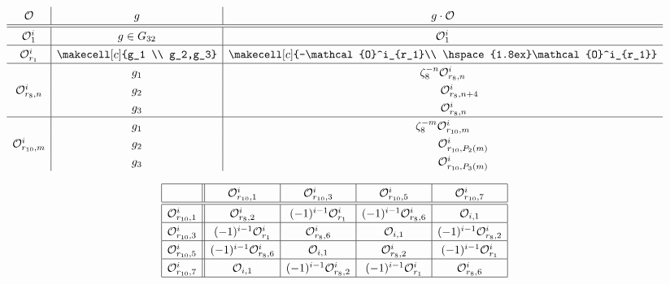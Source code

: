 \documentclass[aps,twocolumn,prx,floatfix,preprintnumbers, nofootinbib,10pt]{revtex4-2}
\numberwithin{equation}{section}
\theoremstyle{definition}
\newcommand{\cO}{\mathcal{O}}
\renewcommand{\Vec}{\mathsf{Vec}}
\begin{document}
\begin{table}
$$\def\arraystretch{1.3}
\begin{array}{c|c|c}
     \cO & g & g\cdot \cO \cr
     \hline
     \hline
     \cO^i_{1} & g\in G_{32} & \cO^i_{1} \cr
     \hline
     \cO^i_{r_1} & \makecell[c]{g_1 \\ g_2,g_3} & \makecell[c]{-\cO^i_{r_1}\\ \hspace{1.8ex}\cO^i_{r_1}} \cr
     \hline
     & g_1 & \zeta_8^{-n} \cO^i_{r_{8},n} \cr
     \cO^i_{r_{8},n} & g_2 & \hspace{6.8ex}\cO^i_{r_{8},{n+4}} \cr
     & g_3 & \hspace{4.5ex}\cO^i_{r_{8},{n}} \cr
     \hline
     & g_1 & \zeta_8^{-m}\cO^i_{r_{10},m} \cr
     \cO^i_{r_{10},m} & g_2 & \hspace{8.3ex}\cO^i_{r_{10},P_2(m)} \cr
     & g_3 & \hspace{8.3ex}\cO^i_{r_{10},P_3(m)}
\end{array}
$$
\caption{Symmetry $\Vec_{G_{32}}^\omega$ action on the local operators. Here, $n=2,6$ for $\cO^i_{r_{8},n}$, and the $n+4$ in the subscript of $\cO^i_{r_{8},{n+4}}$ is understood as $n+4 \equiv \text{ mod }{8}$. For the operators $\cO^i_{r_{10},m}$, $m=1,3,5,7$, $P_2=(13)(57)$ and $P_3=(15)(37)$ denote the permutations on the index set $\{1,3,5,7\}$ for $m$. Note that, in this basis, the group action takes the same form, independent on the label $i=1,2$ for the condensable algebra. \label{tab:G3243action}}
\end{table}

\begin{table}
$$
\begin{array}{|c||c|c|c|c|}\hline
     & \cO^i_{r_{10},1} & \cO^i_{r_{10},3} & \cO^i_{r_{10},5} & \cO^i_{r_{10},7} \cr
    \hline\hline
    \cO^i_{r_{10},1} &  \cO^i_{r_8, 2} & (-1)^{i-1}\cO^i_{r_1} & (-1)^{i-1}\cO^i_{r_8, 6} & \cO_{i,1} \cr\hline
    \cO^i_{r_{10},3} & (-1)^{i-1}\cO^i_{r_1} & \cO^i_{r_8, 6} & \cO_{i,1} & (-1)^{i-1}\cO^i_{r_8, 2} \cr\hline
    \cO^i_{r_{10},5} & (-1)^{i-1}\cO^i_{r_8, 6} & \cO_{i,1} & \cO^i_{r_8, 2} & (-1)^{i-1}\cO^i_{r_1} \cr\hline
    \cO^i_{r_{10},7} & \cO_{i,1} & (-1)^{i-1}\cO^i_{r_8, 2} & (-1)^{i-1}\cO^i_{r_1} & \cO^i_{r_8, 6} \cr\hline
\end{array}
$$
\caption{Multiplication table of the local operators $\cO^i_{r_{10},n}$ obtained from the $([1],r_{10})$ anyon in $A(H_i,1,1,1)$, $i=1,2$.\label{tab:G3243r10OPE}}
\end{table}
\end{document}
